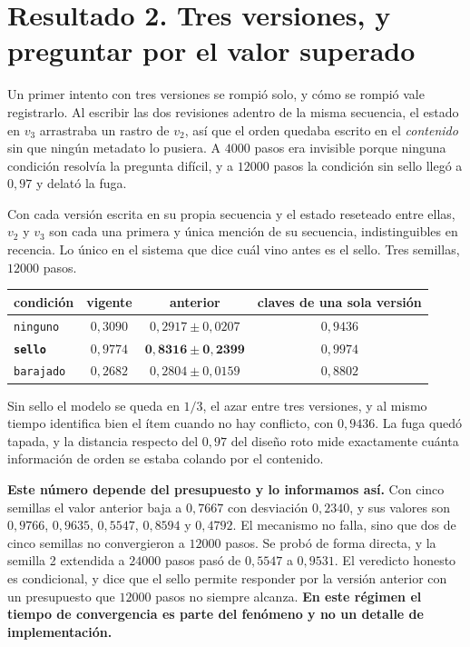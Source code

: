 \documentclass[11pt,a4paper]{article}
\begin{document}
\section{Resultado 2. Tres versiones, y preguntar por el valor superado}

Un primer intento con tres versiones se rompió solo, y cómo se rompió vale registrarlo. Al escribir las
dos revisiones adentro de la misma secuencia, el estado en $v_3$ arrastraba un rastro de $v_2$, así que
el orden quedaba escrito en el \emph{contenido} sin que ningún metadato lo pusiera. A $4000$ pasos era
invisible porque ninguna condición resolvía la pregunta difícil, y a $12000$ pasos la condición sin
sello llegó a $0{,}97$ y delató la fuga.

Con cada versión escrita en su propia secuencia y el estado reseteado entre ellas, $v_2$ y $v_3$ son
cada una primera y única mención de su secuencia, indistinguibles en recencia. Lo único en el sistema
que dice cuál vino antes es el sello. Tres semillas, $12000$ pasos.

\begin{center}
\begin{tabular}{lccc}
\toprule
condición & vigente & \textbf{anterior} & claves de una sola versión \\
\midrule
\texttt{ninguno} & $0{,}3090$ & $0{,}2917 \pm 0{,}0207$ & $0{,}9436$ \\
\textbf{\texttt{sello}} & $0{,}9774$ & $\mathbf{0{,}8316 \pm 0{,}2399}$ & $0{,}9974$ \\
\texttt{barajado} & $0{,}2682$ & $0{,}2804 \pm 0{,}0159$ & $0{,}8802$ \\
\bottomrule
\end{tabular}
\end{center}

Sin sello el modelo se queda en $1/3$, el azar entre tres versiones, y al mismo tiempo identifica bien
el ítem cuando no hay conflicto, con $0{,}9436$. La fuga quedó tapada, y la distancia respecto del
$0{,}97$ del diseño roto mide exactamente cuánta información de orden se estaba colando por el
contenido.

\textbf{Este número depende del presupuesto y lo informamos así.} Con cinco semillas el valor anterior
baja a $0{,}7667$ con desviación $0{,}2340$, y sus valores son $0{,}9766$, $0{,}9635$, $0{,}5547$,
$0{,}8594$ y $0{,}4792$. El mecanismo no falla, sino que dos de cinco semillas no convergieron a
$12000$ pasos. Se probó de forma directa, y la semilla 2 extendida a $24000$ pasos pasó de $0{,}5547$
a $0{,}9531$. El veredicto honesto es condicional, y dice que el sello permite responder por la versión
anterior con un presupuesto que $12000$ pasos no siempre alcanza. \textbf{En este régimen el tiempo de
convergencia es parte del fenómeno y no un detalle de implementación.}
\end{document}
